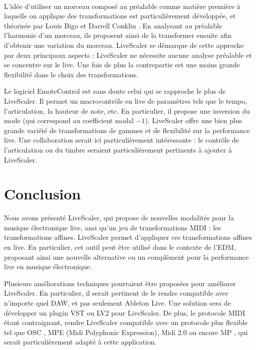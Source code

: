 \documentclass{article}
\begin{document}
\paragraph*{}
L'idée d'utiliser un morceau composé au préalable comme matière première à laquelle on applique des transformations est particulièrement développée, et théorisée par Louis Bigo et Darrell Conklin \cite{bigo2016viewpoint}. En analysant au préalable l'harmonie d'un morceau, ils proposent ainsi de la transformer ensuite afin d'obtenir une variation du morceau. LiveScaler se démarque de cette approche par deux principaux aspects : LiveScaler ne nécessite aucune analyse préalable et se concentre sur le live. Une fois de plus la contrepartie est une moins grande flexibilité dans le choix des transformations.

Le logiciel EmoteControl \cite{micallef2021emotecontrol} est sans doute celui qui se rapproche le plus de LiveScaler. Il permet un macrocontrôle en live de paramètres tels que le tempo, l'articulation, la hauteur de note, etc. En particulier, il propose une inversion du mode (qui correspond au coefficient modal $-1$).  LiveScaler offre une bien plus grande variété de transformations de gammes et de flexibilité sur la performance live. Une collaboration serait ici particulièrement intéressante : le contrôle de l'articulation ou du timbre seraient particulièrement pertinents à ajouter à LiveScaler.

\section{Conclusion}
Nous avons présenté LiveScaler, qui propose de nouvelles modalités pour la musique électronique live, ansi qu'un jeu de transformations MIDI : les transformations affines.  Live\-Scaler permet d'appliquer ces transformations affines en live. En particulier, cet outil peut être utilisé dans le contexte de l'EDM, proposant ainsi une nouvelle alternative ou un complément pour la performance live en musique électronique.

Plusieurs améliorations techniques pourraient être proposées pour améliorer LiveScaler. En particulier, il serait pertinent de le rendre compatible avec n'importe quel DAW, et pas seulement Ableton Live. Une solution sera de  développer un plugin VST ou LV2 pour LiveScaler. De plus, le protocole MIDI étant contraignant, rendre LiveScaler compatible avec un protocole plus flexible tel que OSC \cite{wright2005open}, MPE (Midi Polyphonic Expression), Midi 2.0 ou encore  MP \cite{goudard2017mapping}, qui serait particulièrement adapté à cette application.
\end{document}
